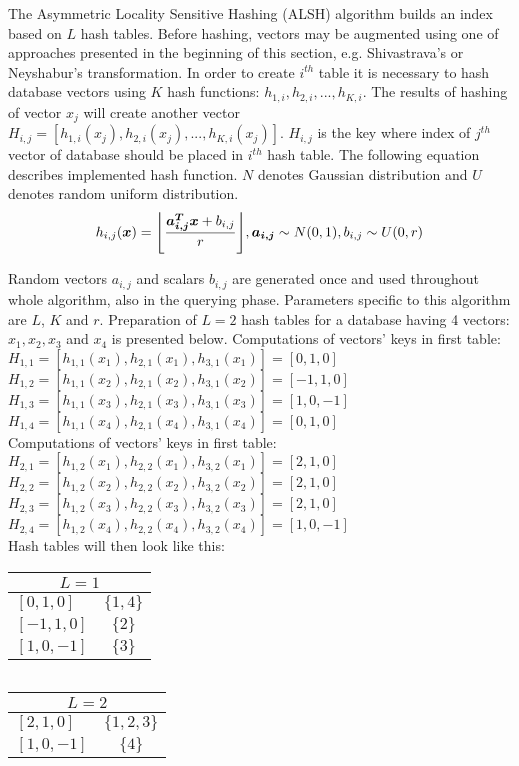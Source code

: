 The Asymmetric Locality Sensitive Hashing (ALSH) \cite{alsh} algorithm builds an index based on $L$ hash tables.
Before hashing, vectors may be augmented using one of approaches presented in the beginning of this section, e.g. Shivastrava's or Neyshabur's transformation.
In order to create $i^{th}$ table it is necessary to hash database vectors using $K$ hash functions: $h_{1,i}, h_{2,i}, ..., h_{K,i}$.
The results of hashing of vector $x_j$ will create another vector $H_{i,j} = [h_{1,i}(x_j), h_{2,i}(x_j), ..., h_{K,i}(x_j)]$. $H_{i,j}$ is the key where index of $j^{th}$ vector of database should be placed in $i^{th}$ hash table.
The following equation describes implemented hash function.
$N$ denotes Gaussian distribution and $U$ denotes random uniform distribution.
\begin{equation*}
h_{i,j}(\bm{x}) = \floor*{\frac{\bm{a_{i,j}^T x} + b_{i,j}}{r}}, \bm{a_{i,j}} \sim N(0,1), b_{i,j} \sim U(0,r)
\end{equation*}
\par
Random vectors $a_{i,j}$ and scalars $b_{i,j}$ are generated once and used throughout whole algorithm, also in the querying phase.
Parameters specific to this algorithm are $L$, $K$ and $r$.
Preparation of $L = 2$ hash tables for a database having 4 vectors: $x_1, x_2, x_3$ and $x_4$ is presented below.
Computations of vectors' keys in first table:\\
$H_{1,1} = [h_{1,1}(x_1), h_{2,1}(x_1), h_{3,1}(x_1)] = [0, 1, 0]$\\
$H_{1,2} = [h_{1,1}(x_2), h_{2,1}(x_2), h_{3,1}(x_2)] = [-1, 1, 0]$\\
$H_{1,3} = [h_{1,1}(x_3), h_{2,1}(x_3), h_{3,1}(x_3)] = [1, 0, -1]$\\
$H_{1,4} = [h_{1,1}(x_4), h_{2,1}(x_4), h_{3,1}(x_4)] = [0, 1, 0]$\\
Computations of vectors' keys in first table:\\
$H_{2,1} = [h_{1,2}(x_1), h_{2,2}(x_1), h_{3,2}(x_1)] = [2, 1, 0]$\\
$H_{2,2} = [h_{1,2}(x_2), h_{2,2}(x_2), h_{3,2}(x_2)] = [2, 1, 0]$\\
$H_{2,3} = [h_{1,2}(x_3), h_{2,2}(x_3), h_{3,2}(x_3)] = [2, 1, 0]$\\
$H_{2,4} = [h_{1,2}(x_4), h_{2,2}(x_4), h_{3,2}(x_4)] = [1, 0, -1]$\\
Hash tables will then look like this:
\renewcommand{\arraystretch}{1.2}
\begin{center}
\begin{tabular}{|l|c|}
\hline
\multicolumn{2}{|c|}{$L = 1$} \\
\hline
$[0, 1, 0]$ & $\{1, 4\}$ \\
\hline
$[-1, 1, 0]$ & $\{2\}$ \\
\hline
$[1, 0, -1]$ & $\{3\}$ \\
\hline
\end{tabular}
$\ \ \ \ $
\begin{tabular}{|l|c|}
\hline
\multicolumn{2}{|c|}{$L = 2$} \\
\hline
$[2, 1, 0]$ & $\{1, 2, 3\}$ \\
\hline
$[1, 0, -1]$ & $\{4\}$ \\
\hline
\end{tabular}
\end{center}
